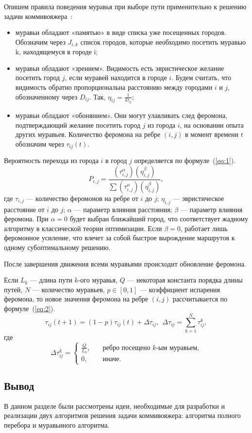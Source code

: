 Опишем правила поведения муравья при выборе пути применительно к решению задачи коммивояжера~\cite{shtovba}:

\begin{itemize}[label=---]
	\item муравьи обладают «памятью» в виде списка уже посещенных городов. Обозначим через $J_{i, k}$ список городов, которые необходимо посетить муравью k, находящемуся в городе i;
	\item муравьи обладают «зрением». Видимость есть эвристическое желание посетить город $j$, если муравей находится в городе $i$. Будем считать, что видимость обратно пропорциональна расстоянию между городами $i$ и $j$, обозначенному через $D_{ij}$. Так, $\eta_{ij} = \frac{1}{D_{ij}}$;
	\item муравьи обладают «обонянием». Они могут улавливать след феромона, подтверждающий желание посетить город $j$ из города $i$, на основании опыта других муравьев. Количество феромона на ребре $(i, j)$ в момент времени $t$ обозначим через $\tau_{ij}(t)$.
\end{itemize}

Вероятность перехода из города $i$ в город $j$ определяется по формуле~(\ref{eq:1}).
\begin{equation}
	\label{eq:1}
	P_{i,j}={\frac {(\tau_{i,j}^{\alpha})(\eta_{i,j}^{\beta })}{\sum (\tau_{i,j}^{\alpha})(\eta_{i,j}^{\beta})}},
\end{equation}
где  $\tau_{i,j}$ --- количество феромонов на ребре от $i$ до $j$;
$\eta_{i,j}$ --- эвристическое расстояние от $i$ до $j$;
$\alpha$ --- параметр влияния расстояния;
$\beta$ --- параметр влияния феромона.
При $\alpha = 0$ будет выбран ближайший город, что соответствует жадному алгоритму в классической теории оптимизации. Если $\beta=0$, работает лишь феромонное усиление, что влечет за собой быстрое вырождение маршрутов к одному субоптимальному решению.

После завершения движения всеми муравьями происходит обновление феромона.

Если $L_{k}$ --- длина пути $k$-ого муравья, $Q$ --- некоторая константа порядка длины путей, $N$ --- количество муравьев, $p \in [0, 1]$ --- коэффициент испарения феромона, то новое значения феромона на ребре $(i,j)$ рассчитывается по формуле~(\ref{eq:2}).
\begin{equation}\label{eq:2}
    \tau_{ij}(t+1) = (1-p)\tau_{ij}(t) + \Delta \tau_{ij},~~\Delta \tau_{ij} =
                     \displaystyle\sum_{k=1}^N \tau^k_{ij},
\end{equation}
где
\begin{equation}\label{eq:3}
    \Delta \tau^k_{ij} = \begin{cases}
        \frac{Q}{L_k}, & \quad \textrm{ребро посещено $k$-ым муравьем,} \\
        0, & \quad \textrm{иначе.}
    \end{cases}
\end{equation}

\vspace{\baselineskip}
\subsection*{Вывод}
\vspace{\baselineskip}

В данном разделе были рассмотрены идеи, необходимые для разработки и реализации двух алгоритмов решения задачи коммивояжера: алгоритма полного перебора и муравьиного алгоритма.
